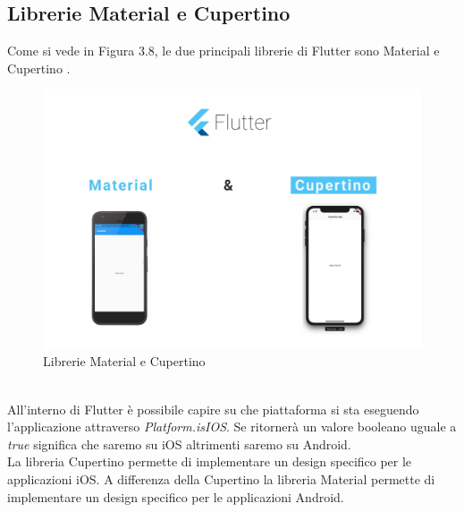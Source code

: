 \subsection{Librerie Material e Cupertino}
Come si vede in Figura 3.8, le due principali librerie di Flutter sono Material e Cupertino \cite{flutterd}. \\ 
\begin{figure}[htbp]	
	\centering
	\includegraphics[width=14cm]{immagini/librerieCM.jpg}
	\caption{Librerie Material e Cupertino \cite{lib}}
	\label{fig:Librerie Material e Cupertino}
\end{figure}
\\
All'interno di Flutter è possibile capire su che piattaforma si sta eseguendo l'applicazione attraverso \textit{Platform.isIOS}.
 Se ritornerà un valore booleano uguale a \textit{true} significa che saremo su iOS altrimenti saremo su Android.\\
La libreria Cupertino permette di implementare un design specifico per le applicazioni iOS.
A differenza della Cupertino la libreria Material permette di implementare un design specifico per le applicazioni Android.

